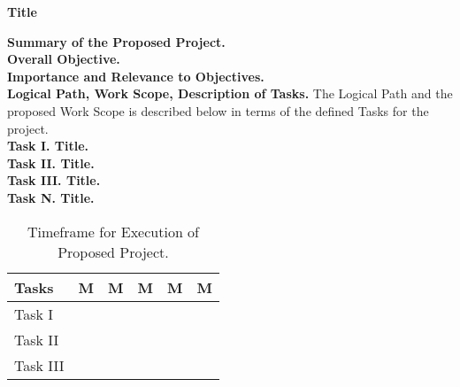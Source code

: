 \documentclass[11pt,a4paper]{article}
\begin{document}
\begin{center}\textbf{Title}\end{center}

\noindent\textbf{Summary of the Proposed Project.} 
\\

\noindent\textbf{Overall Objective.}
\\

\noindent\textbf{Importance and Relevance to Objectives.}
\\

\noindent\textbf{Logical Path, Work Scope, Description of Tasks.} The Logical Path and the proposed Work Scope is described below in terms of the defined Tasks for the project.
\\

\noindent\textbf{Task I. Title.}
\\

\noindent\textbf{Task II. Title.}
\\

\noindent\textbf{Task III. Title.}
\\

\noindent\textbf{Task N. Title.}

\begin{table}[h!]
    \centering
    \caption{Timeframe for Execution of Proposed Project.}
    \begin{tabular}{|l|l|l|l|l|l|}
        \hline
        \textbf{Tasks} & \textbf{M} & \textbf{M} & \textbf{M} & \textbf{M} & \textbf{M} \\
        \hline
        Task I & & & & & \\
        \hline
        Task II & & & & & \\
        \hline
        Task III & & & & & \\
        \hline
    \end{tabular}
    \label{tab-timeframe}
\end{table}

%
%
\end{document}
